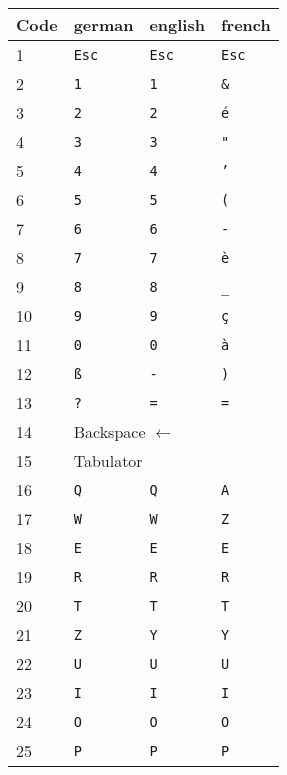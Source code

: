 \begin{longtable}{|l|l|l|l|}
  \hline
  \textbf{Code} & \textbf{german} & \textbf{english} & \textbf{french} \\
  \endhead
  \hline
  1 & \texttt{Esc} & \texttt{Esc} & \texttt{Esc} \\ \hline
  2 & \texttt{1}   & \texttt{1}   & \texttt{\&} \\ \hline
  3 & \texttt{2}   & \texttt{2}   & \texttt{é} \\ \hline
  4 & \texttt{3}   & \texttt{3}   & \texttt{"} \\ \hline
  5 & \texttt{4}   & \texttt{4}   & \texttt{'} \\ \hline
  6 & \texttt{5}   & \texttt{5}   & \texttt{(} \\ \hline
  7 & \texttt{6}   & \texttt{6}   & \texttt{-} \\ \hline
  8 & \texttt{7}   & \texttt{7}   & \texttt{è} \\ \hline
  9 & \texttt{8}   & \texttt{8}   & \texttt{\_} \\ \hline
  10 & \texttt{9}   & \texttt{9}   & \texttt{ç} \\ \hline
  11 & \texttt{0}   & \texttt{0}   & \texttt{à} \\ \hline
  12 & \texttt{ß}   & \texttt{-}   & \texttt{)} \\ \hline
  13 & \texttt{?}   & \texttt{=}   & \texttt{=} \\ \hline
  14 & \multicolumn{3}{|l|}{Backspace $\longleftarrow$} \\ \hline
  15 & \multicolumn{3}{|l|}{Tabulator} \\ \hline
  16 & \texttt{Q} & \texttt{Q} & \texttt{A} \\ \hline
  17 & \texttt{W} & \texttt{W} & \texttt{Z} \\ \hline
  18 & \texttt{E} & \texttt{E} & \texttt{E} \\ \hline
  19 & \texttt{R} & \texttt{R} & \texttt{R} \\ \hline
  20 & \texttt{T} & \texttt{T} & \texttt{T} \\ \hline
  21 & \texttt{Z} & \texttt{Y} & \texttt{Y} \\ \hline
  22 & \texttt{U} & \texttt{U} & \texttt{U} \\ \hline
  23 & \texttt{I} & \texttt{I} & \texttt{I} \\ \hline
  24 & \texttt{O} & \texttt{O} & \texttt{O} \\ \hline
  25 & \texttt{P} & \texttt{P} & \texttt{P} \\ \hline

\end{longtable}
